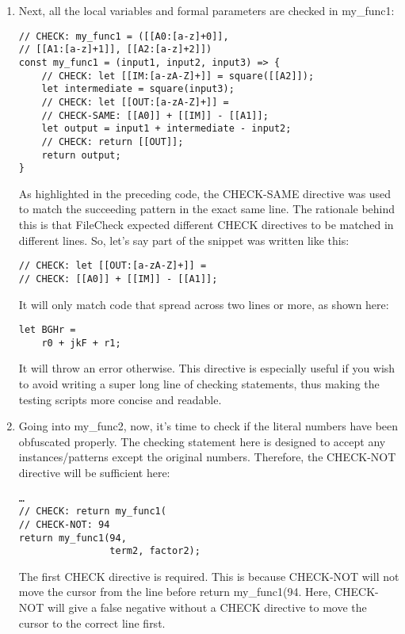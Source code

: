 \begin{enumerate}
\item Next, all the local variables and formal parameters are checked in my\_func1:

\begin{lstlisting}[style=styleJavaScript]
// CHECK: my_func1 = ([[A0:[a-z]+0]],
// [[A1:[a-z]+1]], [[A2:[a-z]+2]])
const my_func1 = (input1, input2, input3) => {
	// CHECK: let [[IM:[a-zA-Z]+]] = square([[A2]]);
	let intermediate = square(input3);
	// CHECK: let [[OUT:[a-zA-Z]+]] =
	// CHECK-SAME: [[A0]] + [[IM]] - [[A1]];
	let output = input1 + intermediate - input2;
	// CHECK: return [[OUT]];
	return output;
}
\end{lstlisting}

As highlighted in the preceding code, the CHECK-SAME directive was used to match the succeeding pattern in the exact same line. The rationale behind this is that FileCheck expected different CHECK directives to be matched in different lines. So, let's say part of the snippet was written like this:

\begin{lstlisting}[style=styleJavaScript]
// CHECK: let [[OUT:[a-zA-Z]+]] =
// CHECK: [[A0]] + [[IM]] - [[A1]];
\end{lstlisting}

It will only match code that spread across two lines or more, as shown here:

\begin{lstlisting}[style=styleJavaScript]
let BGHr =
	r0 + jkF + r1;
\end{lstlisting}

It will throw an error otherwise. This directive is especially useful if you wish to avoid writing a super long line of checking statements, thus making the testing scripts more concise and readable.

\item Going into my\_func2, now, it's time to check if the literal numbers have been obfuscated properly. The checking statement here is designed to accept any instances/patterns except the original numbers. Therefore, the CHECK-NOT directive will be sufficient here:

\begin{lstlisting}[style=styleJavaScript]
…
// CHECK: return my_func1(
// CHECK-NOT: 94
return my_func1(94,
				term2, factor2);
\end{lstlisting}

\begin{tcolorbox}[colback=blue!5!white,colframe=blue!75!black, fonttitle=\bfseries,title=Note]
\hspace*{0.7cm}The first CHECK directive is required. This is because CHECK-NOT will not move the cursor from the line before return my\_func1(94. Here, CHECK-NOT will give a false negative without a CHECK directive to move the cursor to the correct line first.
\end{tcolorbox}


\end{enumerate}
